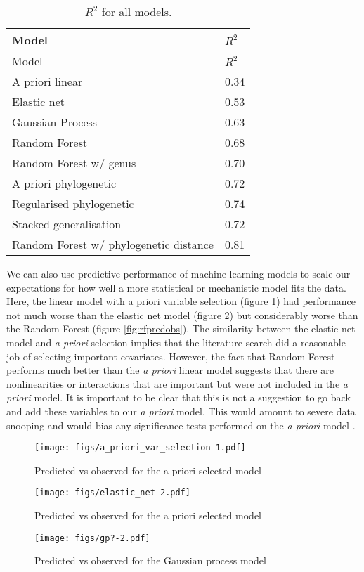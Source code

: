 \documentclass[10pt,]{article}
\begin{document}
\begin{longtable}[c]{@{}ll@{}}
\caption{\(R^2\) for all models. \label{tbl:allr2}}\tabularnewline
\toprule
Model & \(R^2\)\tabularnewline
\midrule
\endfirsthead
\toprule
Model & \(R^2\)\tabularnewline
\midrule
\endhead
A priori linear & 0.34\tabularnewline
Elastic net & 0.53\tabularnewline
Gaussian Process & 0.63\tabularnewline
Random Forest & 0.68\tabularnewline
Random Forest w/ genus & 0.70\tabularnewline
A priori phylogenetic & 0.72\tabularnewline
Regularised phylogenetic & 0.74\tabularnewline
Stacked generalisation & 0.72\tabularnewline
Random Forest w/ phylogenetic distance & 0.81\tabularnewline
\bottomrule
\end{longtable}

We can also use predictive performance of machine learning models to scale our expectations for how well a more statistical or mechanistic model fits the data. Here, the linear model with a priori variable selection (figure \ref{fig:aprioripredobs}) had performance not much worse than the elastic net model (figure \ref{fig:enetpredobs}) but considerably worse than the Random Forest (figure \ref{fig:rfpredobs}). The similarity between the elastic net model and \emph{a priori} selection implies that the literature search did a reasonable job of selecting important covariates. However, the fact that Random Forest performs much better than the \emph{a priori} linear model suggests that there are nonlinearities or interactions that are important but were not included in the \emph{a priori} model. It is important to be clear that this is not a suggestion to go back and add these variables to our \emph{a priori} model. This would amount to severe data snooping and would bias any significance tests performed on the \emph{a priori} model \citep{snoop}.

\begin{figure}[htbp]
\centering
\texttt{[image: figs/a\_priori\_var\_selection-1.pdf]}
\caption{Predicted vs observed for the a priori selected model\protect\label{fig:aprioripredobs}}
\end{figure}

\begin{figure}[htbp]
\centering
\texttt{[image: figs/elastic\_net-2.pdf]}
\caption{Predicted vs observed for the a priori selected model\protect\label{fig:enetpredobs}}
\end{figure}

\begin{figure}[htbp]
\centering
\texttt{[image: figs/gp?-2.pdf]}
\caption{Predicted vs observed for the Gaussian process model\protect\label{fig:gppredobs}}
\end{figure}
\end{document}
